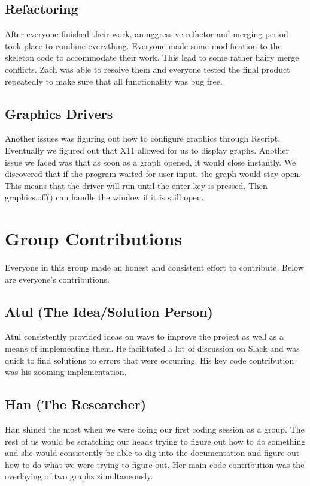 \documentclass{article}
\begin{document}
\subsection{Refactoring}
After everyone finished their work, an aggressive refactor and merging period took place to combine everything. Everyone made some modification to the skeleton code to accommodate their work. This lead to some rather hairy merge conflicts. Zach was able to resolve them and everyone tested the final product repeatedly to make sure that all functionality was bug free.
\subsection{Graphics Drivers}
Another issues was figuring out how to configure graphics through Rscript. Eventually we figured out that X11 allowed for us to display graphs. Another issue we faced was that as soon as a graph opened, it would close instantly. We discovered that if the program waited for user input, the graph would stay open. This means that the driver will run until the enter key is pressed. Then graphics.off() can handle the window if it is still open.

\section{Group Contributions}
Everyone in this group made an honest and consistent effort to contribute. Below are everyone's contributions.\\
\subsection{Atul (The Idea/Solution Person)}
Atul consistently provided ideas on ways to improve the project as well as a means of implementing them. He facilitated a lot of discussion on Slack and was quick to find solutions to errors that were occurring. His key code contribution was his zooming implementation.
\subsection{Han (The Researcher)}
Han shined the most when we were doing our first coding session as a group. The rest of us would be scratching our heads trying to figure out how to do something and she would consistently be able to dig into the documentation and figure out how to do what we were trying to figure out. Her main code contribution was the overlaying of two graphs simultaneously.
\end{document}
